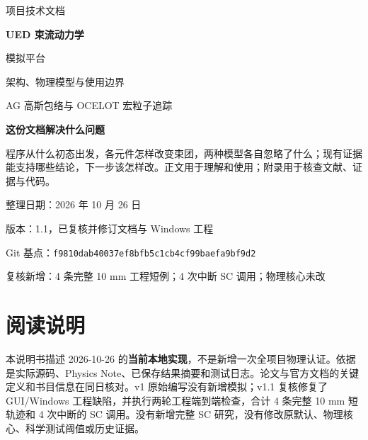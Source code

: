 \documentclass[UTF8,fontset=fandol,11pt,a4paper]{ctexart}
\begin{document}
\begin{titlepage}\color{ink}\vspace*{16mm}
{\large 项目技术文档\par}\vspace{9mm}
{\Huge\bfseries UED 束流动力学\par 模拟平台\par}\vspace{7mm}
{\LARGE 架构、物理模型与使用边界\par}\vspace{5mm}
{\large AG 高斯包络与 OCELOT 宏粒子追踪\par}\vspace{15mm}
\vfill
\begin{plainbox}\textbf{这份文档解决什么问题}\par
程序从什么初态出发，各元件怎样改变束团，两种模型各自忽略了什么；现有证据能支持哪些结论，下一步该怎样改。正文用于理解和使用；附录用于核查文献、证据与代码。
\end{plainbox}\vspace{6mm}
\noindent 整理日期：2026 年 10 月 26 日\par
\noindent 版本：1.1，已复核并修订文档与 Windows 工程\par
\noindent Git 基点：\texttt{f9810dab40037ef8bfb5c1cb4cf99baefa9bf9d2}\par
\noindent 复核新增：4 条完整 10 mm 工程短例；4 次中断 SC 调用；物理核心未改
\end{titlepage}
\section*{阅读说明}
本说明书描述 2026-10-26 的\textbf{当前本地实现}，不是新增一次全项目物理认证。依据是实际源码、Physics Note、已保存结果摘要和测试日志。论文与官方文档的关键定义和书目信息在同日核对。v1 原始编写没有新增模拟；v1.1 复核修复了 GUI/Windows 工程缺陷，并执行两轮工程端到端检查，合计 4 条完整 10 mm 短轨迹和 4 次中断的 SC 调用。没有新增完整 SC 研究，没有修改原默认、物理核心、科学测试阈值或历史证据。
\end{document}
